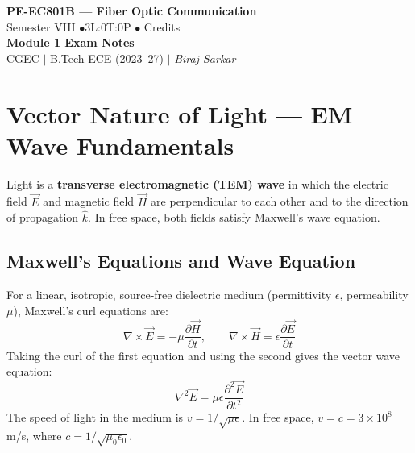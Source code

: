 \documentclass[12pt,a4paper]{article}
\begin{document}

\begin{center}
  {\LARGE\bfseries\color{myred} PE-EC801B --- Fiber Optic Communication}\\[5pt]
  {\normalsize\color{mydark} Semester VIII \quad$\bullet$\quad 3L:0T:0P \quad$\bullet$ Credits}\\[3pt]
  {\normalsize\color{myteal}\textbf{Module 1 Exam Notes}}\\[3pt]
  {\small\color{mydark} CGEC \;$|$\; B.Tech ECE (2023--27) \;$|$\; \textit{Biraj Sarkar}}
\end{center}
\vspace{2pt}
\noindent{\color{myred}\rule{\linewidth}{1.5pt}}
\vspace{2pt}

\hypersetup{linkcolor=mydark}
\tableofcontents
\hypersetup{linkcolor=myteal}
\newpage

\section{Vector Nature of Light --- EM Wave Fundamentals}

\begin{tcolorbox}[defbox, title={\textbf{Light as an Electromagnetic Wave}}]
Light is a \textbf{transverse electromagnetic (TEM) wave} in which the electric field $\vec{E}$ and magnetic field $\vec{H}$ are perpendicular to each other and to the direction of propagation $\hat{k}$. In free space, both fields satisfy Maxwell's wave equation.
\end{tcolorbox}

\subsection{Maxwell's Equations and Wave Equation}
For a linear, isotropic, source-free dielectric medium (permittivity $\epsilon$, permeability $\mu$), Maxwell's curl equations are:
\[
\nabla \times \vec{E} = -\mu \frac{\partial \vec{H}}{\partial t}, \qquad \nabla \times \vec{H} = \epsilon \frac{\partial \vec{E}}{\partial t}
\]
Taking the curl of the first equation and using the second gives the vector wave equation:
\[
\nabla^2 \vec{E} = \mu\epsilon \frac{\partial^2 \vec{E}}{\partial t^2}
\]
The speed of light in the medium is $v = 1/\sqrt{\mu\epsilon}$. In free space, $v = c = 3\times10^8$ m/s, where $c = 1/\sqrt{\mu_0\epsilon_0}$.
\end{document}

